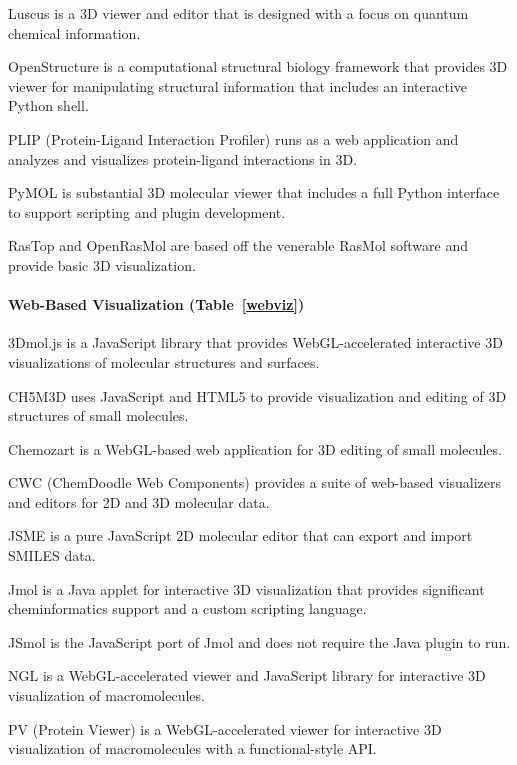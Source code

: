 Luscus \cite{Kova_evi__2015} is a 3D viewer and editor that is designed with a focus on quantum chemical information.

OpenStructure \cite{Biasini_2013} is a computational structural biology framework that provides 3D viewer for manipulating structural information that includes an interactive Python shell.

PLIP (Protein-Ligand Interaction Profiler) \cite{Salentin_2015} runs as a web application and analyzes and visualizes protein-ligand interactions in 3D.

PyMOL is substantial 3D molecular viewer that includes a full Python interface to support scripting and plugin development.

RasTop and OpenRasMol are based off the venerable RasMol software and provide basic 3D visualization. 

\paragraph{Web-Based Visualization (Table~\ref{webviz})}

3Dmol.js \cite{Rego_2014} is a JavaScript library that provides WebGL-accelerated interactive 3D visualizations of molecular structures and surfaces.

CH5M3D \cite{Earley_2013} uses JavaScript and HTML5 to provide visualization and editing of 3D structures of small molecules.

Chemozart \cite{Mohebifar_2015} is a WebGL-based web application for 3D editing of small molecules.

CWC (ChemDoodle Web Components) \cite{Burger_2015} provides a suite of web-based visualizers and editors for 2D and 3D molecular data.

JSME \cite{Bienfait_2013} is a pure JavaScript 2D molecular editor that can export and import SMILES data.

Jmol \cite{Hanson_2010} is a Java applet for interactive 3D visualization that provides significant cheminformatics support and a custom scripting language.

JSmol \cite{Hanson_2013} is the JavaScript port of Jmol and does not require the Java plugin to run.

NGL \cite{Rose_2015} is a WebGL-accelerated viewer and JavaScript library for interactive 3D visualization of macromolecules.

PV (Protein Viewer) \cite{95f13b46-4e83-4cdd-afc0-6de07bca5ae8} is a WebGL-accelerated viewer for interactive 3D visualization of macromolecules with a functional-style API.




